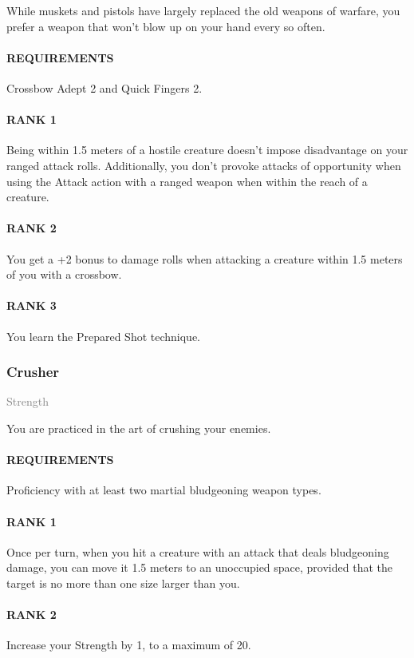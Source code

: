 \normalsize
While muskets and pistols have largely replaced the old weapons of warfare, you prefer a weapon that won't blow up on your hand every so often.
\paragraph{REQUIREMENTS} Crossbow Adept 2 and Quick Fingers 2.
\paragraph{RANK 1} Being within 1.5 meters of a hostile creature doesn't impose disadvantage on your ranged attack rolls.
Additionally, you don't provoke attacks of opportunity when using the Attack action with a ranged weapon when within the reach of a creature.
\paragraph{RANK 2} You get a +2 bonus to damage rolls when attacking a creature within 1.5 meters of you with a crossbow.
\paragraph{RANK 3} You learn the Prepared Shot technique.

\subsubsection{Crusher} \label{feat::crusher}
\small{\textcolor{gray}{Strength}}

\normalsize
You are practiced in the art of crushing your enemies.
\paragraph{REQUIREMENTS} Proficiency with at least two martial bludgeoning weapon types.
\paragraph{RANK 1} Once per turn, when you hit a creature with an attack that deals bludgeoning damage, you can move it 1.5 meters to an unoccupied space, provided that the target is no more than one size larger than you.
\paragraph{RANK 2} Increase your Strength by 1, to a maximum of 20.
